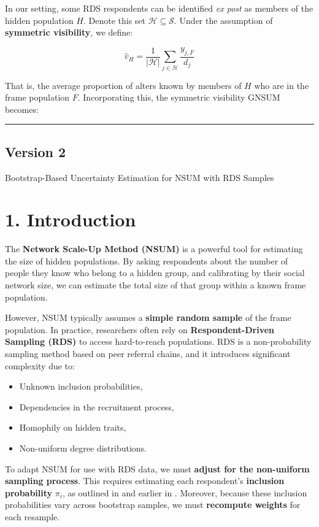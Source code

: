 \documentclass[
  12pt,
  letterpaper,
  DIV=11,
  numbers=noendperiod]{scrartcl}
\theoremstyle{plain}
\theoremstyle{definition}
\begin{document}
In our setting, some RDS respondents can be identified \emph{ex post} as
members of the hidden population \(H\). Denote this set
\(\mathcal{H} \subseteq \mathcal{S}\). Under the assumption of
\textbf{symmetric visibility}, we define:

\[
\hat{v}_{H} = \frac{1}{|\mathcal{H}|} \sum_{j \in \mathcal{H}} \frac{y_{j,F}}{d_j}
\]

That is, the average proportion of alters known by members of \(H\) who
are in the frame population \(F\). Incorporating this, the symmetric
visibility GNSUM becomes:

\begin{center}\rule{0.5\linewidth}{0.5pt}\end{center}

\subsection{Version 2}\label{version-2}

Bootstrap-Based Uncertainty Estimation for NSUM with RDS Samples

\section{1. Introduction}\label{introduction-2}

The \textbf{Network Scale-Up Method (NSUM)} is a powerful tool for
estimating the size of hidden populations. By asking respondents about
the number of people they know who belong to a hidden group, and
calibrating by their social network size, we can estimate the total size
of that group within a known frame population.

However, NSUM typically assumes a \textbf{simple random sample} of the
frame population. In practice, researchers often rely on
\textbf{Respondent-Driven Sampling (RDS)} to access hard-to-reach
populations. RDS is a non-probability sampling method based on peer
referral chains, and it introduces significant complexity due to:

\begin{itemize}
\item
  Unknown inclusion probabilities,
\item
  Dependencies in the recruitment process,
\item
  Homophily on hidden traits,
\item
  Non-uniform degree distributions.
\end{itemize}

To adapt NSUM for use with RDS data, we must \textbf{adjust for the
non-uniform sampling process}. This requires estimating each
respondent's \textbf{inclusion probability} \(\pi_i\), as outlined in
\textcite{feeh16-generaling} and earlier in \textcite{salf06-variance}.
Moreover, because these inclusion probabilities vary across bootstrap
samples, we must \textbf{recompute weights} for each resample.
\end{document}
